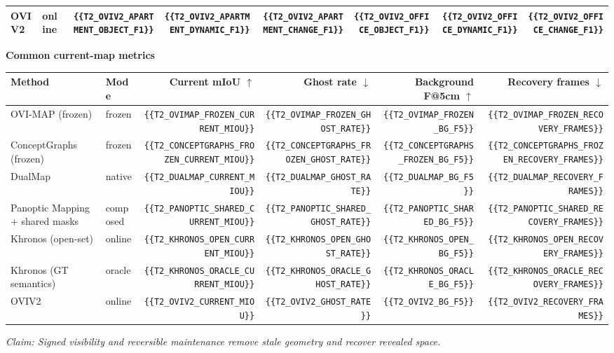 \begin{table}[t]
\begin{tabular}{llrrrrrr}
OVIV2 & online & \verb|{{T2_OVIV2_APARTMENT_OBJECT_F1}}| & \verb|{{T2_OVIV2_APARTMENT_DYNAMIC_F1}}| & \verb|{{T2_OVIV2_APARTMENT_CHANGE_F1}}| & \verb|{{T2_OVIV2_OFFICE_OBJECT_F1}}| & \verb|{{T2_OVIV2_OFFICE_DYNAMIC_F1}}| & \verb|{{T2_OVIV2_OFFICE_CHANGE_F1}}| \\
\bottomrule
\end{tabular}
\par
\vspace{4pt}
\textbf{Common current-map metrics}\\
\begin{tabular}{llrrrr}
\toprule
Method & Mode & Current mIoU $\uparrow$ & Ghost rate $\downarrow$ & Background F@5cm $\uparrow$ & Recovery frames $\downarrow$ \\
\midrule
OVI-MAP (frozen) & frozen & \verb|{{T2_OVIMAP_FROZEN_CURRENT_MIOU}}| & \verb|{{T2_OVIMAP_FROZEN_GHOST_RATE}}| & \verb|{{T2_OVIMAP_FROZEN_BG_F5}}| & \verb|{{T2_OVIMAP_FROZEN_RECOVERY_FRAMES}}| \\
ConceptGraphs (frozen) & frozen & \verb|{{T2_CONCEPTGRAPHS_FROZEN_CURRENT_MIOU}}| & \verb|{{T2_CONCEPTGRAPHS_FROZEN_GHOST_RATE}}| & \verb|{{T2_CONCEPTGRAPHS_FROZEN_BG_F5}}| & \verb|{{T2_CONCEPTGRAPHS_FROZEN_RECOVERY_FRAMES}}| \\
DualMap & native & \verb|{{T2_DUALMAP_CURRENT_MIOU}}| & \verb|{{T2_DUALMAP_GHOST_RATE}}| & \verb|{{T2_DUALMAP_BG_F5}}| & \verb|{{T2_DUALMAP_RECOVERY_FRAMES}}| \\
Panoptic Mapping + shared masks & composed & \verb|{{T2_PANOPTIC_SHARED_CURRENT_MIOU}}| & \verb|{{T2_PANOPTIC_SHARED_GHOST_RATE}}| & \verb|{{T2_PANOPTIC_SHARED_BG_F5}}| & \verb|{{T2_PANOPTIC_SHARED_RECOVERY_FRAMES}}| \\
Khronos (open-set) & online & \verb|{{T2_KHRONOS_OPEN_CURRENT_MIOU}}| & \verb|{{T2_KHRONOS_OPEN_GHOST_RATE}}| & \verb|{{T2_KHRONOS_OPEN_BG_F5}}| & \verb|{{T2_KHRONOS_OPEN_RECOVERY_FRAMES}}| \\
Khronos (GT semantics) & oracle & \verb|{{T2_KHRONOS_ORACLE_CURRENT_MIOU}}| & \verb|{{T2_KHRONOS_ORACLE_GHOST_RATE}}| & \verb|{{T2_KHRONOS_ORACLE_BG_F5}}| & \verb|{{T2_KHRONOS_ORACLE_RECOVERY_FRAMES}}| \\
OVIV2 & online & \verb|{{T2_OVIV2_CURRENT_MIOU}}| & \verb|{{T2_OVIV2_GHOST_RATE}}| & \verb|{{T2_OVIV2_BG_F5}}| & \verb|{{T2_OVIV2_RECOVERY_FRAMES}}| \\
\bottomrule
\end{tabular}
\par
\smallskip
\noindent\textit{Claim: Signed visibility and reversible maintenance remove stale geometry and recover revealed space.}
\end{table}

